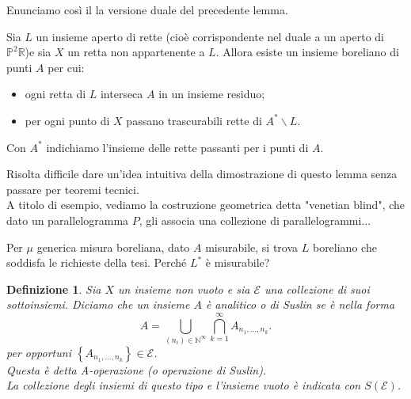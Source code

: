 \documentclass[11pt]{beamer} %
\newcommand{\R}{\mathbb{R}}
\renewcommand{\P}{\mathbb{P}}
\newcommand{\E}{\mathcal{E}}
\newcommand{\<}{\langle}
\renewcommand{\>}{\rangle}
\theoremstyle{theorem}
\theoremstyle{theorem}
\theoremstyle{theorem}
\theoremstyle{theorem}
\newtheorem{defin}[teo]{Definizione}
\theoremstyle{theorem}
\begin{document}
\begin{frame}
	Enunciamo così il la versione duale del precedente lemma.
	
	\begin{lemma}
	Sia $L$ un insieme aperto di rette (cioè corrispondente nel duale a un aperto di $\P^2 \R$)e sia $X$ un retta non appartenente a $L$. Allora esiste un insieme boreliano di punti $A$ per cui:\\
	\begin{itemize}
		\item ogni retta di $L$ interseca $A$ in un insieme residuo;\\
		\item per ogni punto di $X$ passano trascurabili rette di $A^{*} \backslash L$.\\
	\end{itemize}
	Con $A^*$ indichiamo l'insieme delle rette passanti per i punti di $A$.
	\end{lemma}
	
\end{frame}	



\begin{frame}[fragile]
	Risolta difficile dare un'idea intuitiva della dimostrazione di questo lemma senza passare per teoremi tecnici.\\
	
	A titolo di esempio, vediamo la costruzione geometrica detta "venetian blind", che dato un parallelogramma $P$, gli associa una collezione di parallelogrammi...
	
\end{frame}


\begin{frame}[fragile]

Per $\mu$ generica misura boreliana, dato $A$ misurabile, si trova $L$ boreliano che soddisfa le richieste della tesi. Perché $L^*$ è misurabile?

\begin{defin}
	Sia $X$ un insieme non vuoto e sia $\mathcal{E}$ una collezione di suoi sottoinsiemi. Diciamo che un insieme $A$ è analitico o di Suslin se è nella forma
	$$
	A=\bigcup_{\left(n_{i}\right) \in \mathbb{N}^{\infty}} \bigcap_{k=1}^{\infty} A_{n_{1}, \ldots, n_{k}} .
	$$
	per opportuni $\left\{A_{n_{1}, \ldots, n_{k}}\right\} \in \E$.\\
	Questa è detta A-operazione (o operazione di Suslin).\\
	La collezione degli insiemi di questo tipo e l'insieme vuoto è indicata con $S(\mathcal{E})$.
\end{defin}	

\end{frame}
\end{document}
